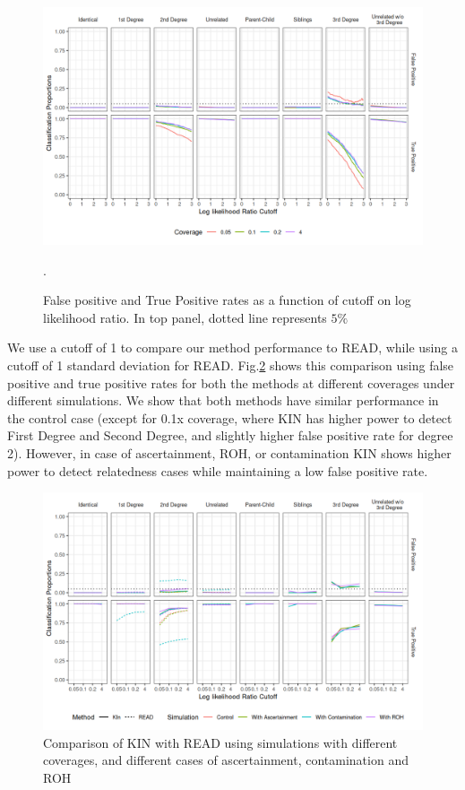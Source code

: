 \documentclass[12pt, letterpaper]{article}
\begin{document}
\begin{figure}[h!]
    \includegraphics[width=16cm]{plots/plotimg/contam0_inbred0_model_performance_allroc_asc0_plot.png}
    \centering
    \caption{False positive and True Positive rates as a function of cutoff on log likelihood ratio. In top panel, dotted line represents $5\%$}.
    \label{fig3:cutoff}
\end{figure}

We use a cutoff of 1 to compare our method performance to READ, while using a cutoff of 1 standard deviation for READ. Fig.\ref{fig4:Comparison_READ_KIN} shows this comparison using false positive and true positive rates for both the methods at different coverages under different simulations. We show that both methods have similar performance in the control case (except for 0.1x coverage, where KIN has higher power to detect First Degree and Second Degree, and slightly higher false positive rate for degree 2). However, in case of ascertainment, ROH, or contamination KIN shows higher power to detect relatedness cases while maintaining a low false positive rate. 

\begin{figure}[h!]
    \includegraphics[width=16cm]{plots/plotimg/comparison_plot.png}
    \centering
    \caption{Comparison of KIN with READ using simulations with different coverages, and different cases of ascertainment, contamination and ROH}
    \label{fig4:Comparison_READ_KIN}
\end{figure}
\end{document}

